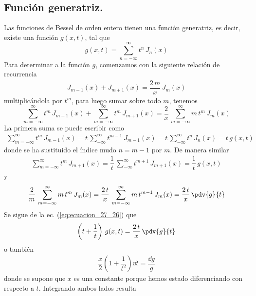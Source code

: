 \subsection{Función generatriz.}
Las funciones de Bessel de orden entero tienen una función generatriz, es decir, existe una función $g(x, t)$, tal que
\begin{equation}
g (x, t) = \sum_{n=-\infty}^{\infty} t^{n} \, J_{n} (x)
\label{eq:ecuacion_27_25}
\end{equation}
Para determinar a la función $g$, comenzamos con la siguiente relación de recurrencia
\begin{align*}
J_{m-1}(x) + J_{m+1} (x) = \dfrac{2 \, m}{x} \, J_{m} (x)
\end{align*}
multiplicándola por $t^{m}$, para luego sumar sobre todo $m$, tenemos
\begin{equation}
\sum_{m=-\infty}^{\infty} t^{m} \, J_{m-1} (x) + \sum_{m=-\infty}^{\infty} t^{m} \, J_{m+1} (x) = \dfrac{2}{x} \, \sum_{m=-\infty}^{\infty} m \, t^{m} \, J_{m} (x)
\label{eq:ecuacion_27_26}
\end{equation}
La primera suma se puede escribir como
\begin{align*}
\sum_{m=-\infty}^{\infty} t^{m} \, J_{m-1} (x) = t \, \sum_{-\infty}^{\infty} t^{m-1} \, J_{m-1} (x) =  t \, \sum_{-\infty}^{\infty} t^{n} \, J_{n} (x) = t \, g(x, t)
\end{align*}
donde se ha sustituido el índice mudo $n = m -1$ por $m$. De manera similar
\begin{align*}
\sum_{m=-\infty}^{\infty} t^{m} \, J_{m+1} (x) = \dfrac{1}{t} \, \sum_{-\infty}^{\infty} t^{m+1} \, J_{m+1} (x) = \dfrac{1}{t} \,  g(x, t)
\end{align*}
y
\begin{align*}
\dfrac{2}{m} \, \sum_{m=-\infty}^{\infty} m \, t^{m} \, J_{m} (x) = \dfrac{2 \, t}{x} \, \sum_{m=-\infty}^{\infty} m \, t^{m-1} \, J_{m} (x) = \dfrac{2 \, t}{x} \, \pdv{g}{t}
\end{align*}
Se sigue de la ec. (\ref{eq:ecuacion_27_26}) que
\begin{align*}
\left( t + \dfrac{1}{t} \right) \, g(x, t) = \dfrac{2 \, t}{x} \, \pdv{g}{t}
\end{align*}
o también
\begin{align*}
\dfrac{x}{2} \left( 1 + \dfrac{1}{t^{2}} \right) \dd{t} = \dfrac{\dd{g}}{g}
\end{align*}
donde se supone que $x$ es una constante porque hemos estado diferenciando con respecto a $t$. Integrando ambos lados resulta
